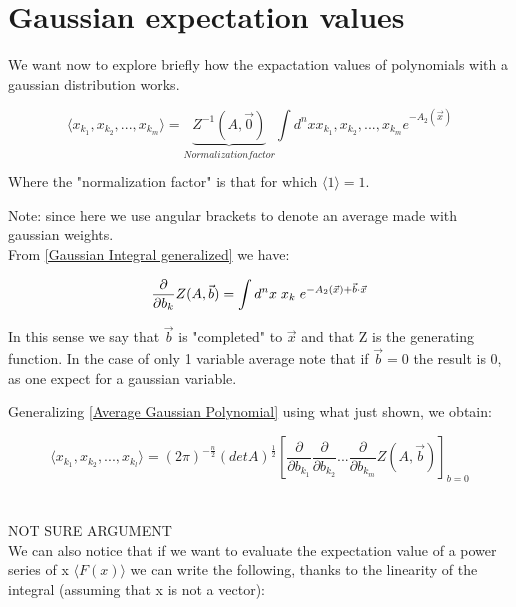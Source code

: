 \documentclass[12pt, english, a4paper]{book}
\begin{document}
\section{Gaussian expectation values}

We want now to explore briefly how the expactation values of polynomials with a gaussian distribution works.

\begin{equation}\label{Average Gaussian Polynomial}
\langle x_{k_1}, x_{k_2}, ... , x_{k_m} \rangle = \underbrace{Z^{-1}(A, \vec{0})}_{Normalization factor} \int d^n x x_{k_1}, x_{k_2}, ... , x_{k_m} e^{-A_2(\vec{x}) }
\end{equation}

Where the "normalization factor" is that for which $ \langle 1 \rangle = 1 $.

Note: since here we use angular brackets to denote an average made with gaussian weights.\\

From \eqref{Gaussian Integral generalized} we have:

$$ \frac{\partial}{\partial b_k} Z(A, \vec{b}) = \int d^n x \hspace{1mm} x_k \hspace{1mm} e^{-A_2(\vec{x}) + \vec{b} \cdot \vec{x}} $$

In this sense we say that $\vec{b}$ is "completed" to $\vec{x}$ and that Z is the generating function.
In the case of only 1 variable average note that if $\vec{b}=0$ the result is 0, as one expect for a gaussian variable.

Generalizing \eqref{Average Gaussian Polynomial} using what just shown, we obtain:

\begin{equation}\label{Average Gaussian Partial}
\langle x_{k_1}, x_{k_2}, ... , x_{k_l} \rangle = (2\pi)^{-\frac{n}{2}} (detA)^{\frac{1}{2}} \left[ \frac{\partial}{\partial b_{k_1}} \frac{\partial}{\partial b_{k_2}} ... \frac{\partial}{\partial b_{k_m}} Z(A, \vec{b}) \right]_{b=0}
\end{equation} \\ \\

NOT SURE ARGUMENT \\
We can also notice that if we want to evaluate the expectation value of a power series of x $ \langle F(x) \rangle $ we can write the following, thanks to the linearity of the integral (assuming that x is not a vector):
\end{document}
